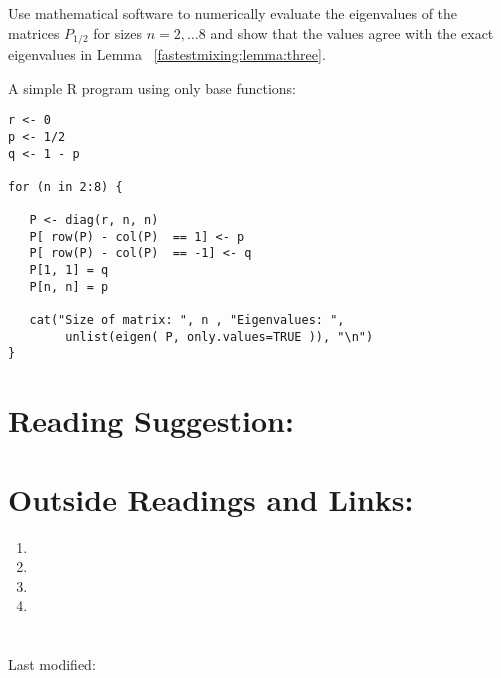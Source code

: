 \documentclass[12pt]{article}
\begin{document}
\begin{exercise}
    Use mathematical software to numerically evaluate the eigenvalues of
    the matrices \( P_{1/2} \) for sizes \( n = 2, \dots 8 \) and show
    that the values agree with the exact eigenvalues in Lemma~%
    \ref{fastestmixing:lemma:three}.
\end{exercise}
\begin{solution}
    A simple R program using only base functions:
\begin{lstlisting}
r <- 0
p <- 1/2
q <- 1 - p

for (n in 2:8) {

   P <- diag(r, n, n)
   P[ row(P) - col(P)  == 1] <- p
   P[ row(P) - col(P)  == -1] <- q
   P[1, 1] = q
   P[n, n] = p

   cat("Size of matrix: ", n , "Eigenvalues: ",
        unlist(eigen( P, only.values=TRUE )), "\n")
}
\end{lstlisting}
\end{solution}

\hr

\section*{Reading Suggestion:}




\hr

\section*{Outside Readings and Links:}
\begin{enumerate}
    \item
    \item
    \item
    \item
\end{enumerate}

\section*{\solutionsname} \loadSolutions

\hr

\mydisclaim \myfooter

Last modified:  \flastmod
\end{document}

